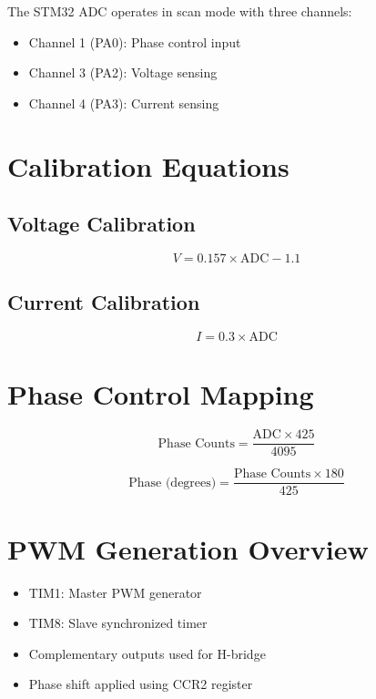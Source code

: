 The STM32 ADC operates in scan mode with three channels:

\begin{itemize}
    \item Channel 1 (PA0): Phase control input  
    \item Channel 3 (PA2): Voltage sensing  
    \item Channel 4 (PA3): Current sensing  
\end{itemize}

\vspace{0.3cm}

\section{Calibration Equations}

\subsection{Voltage Calibration}

\[
V = 0.157 \times \text{ADC} - 1.1
\]

\subsection{Current Calibration}

\[
I = 0.3 \times \text{ADC}
\]

\vspace{0.3cm}

\section{Phase Control Mapping}

\[
\text{Phase Counts} = \frac{\text{ADC} \times 425}{4095}
\]

\[
\text{Phase (degrees)} = \frac{\text{Phase Counts} \times 180}{425}
\]

\vspace{0.3cm}

\section{PWM Generation Overview}

\begin{itemize}
    \item TIM1: Master PWM generator  
    \item TIM8: Slave synchronized timer  
    \item Complementary outputs used for H-bridge  
    \item Phase shift applied using CCR2 register  
\end{itemize}

